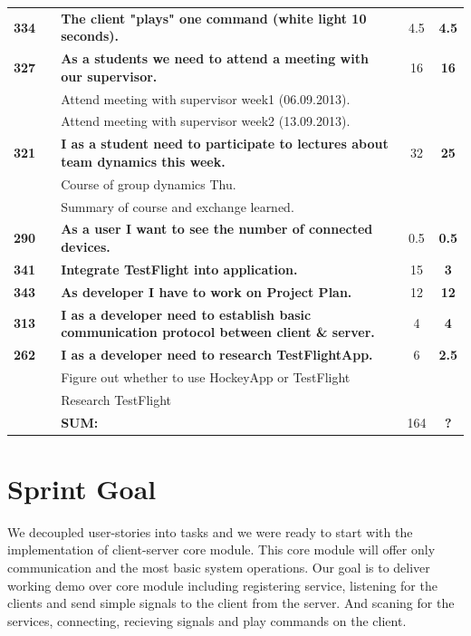 \begin{longtable}
\begin{tabularx}{\textwidth}{ccXcc}
\textbf{334} 	&& {\bf The client "plays" one command (white light 10 seconds). } 	& 		4.5	& \textbf{4.5} \\

\textbf{327} 	&& {\bf As a students we need to attend a meeting with our supervisor. } 	& 		16	& \textbf{16} \\
				&& Attend meeting with supervisor week1 (06.09.2013).	&  &  \\
				&& Attend meeting with supervisor week2 (13.09.2013).	&  &  \\

\textbf{321} 	&& {\bf I as a student need to participate to lectures about team dynamics this week. } 	& 		32	& \textbf{25} \\
				&& Course of group dynamics Thu.	&  &  \\
				&& Summary of course and exchange learned.	&  &  \\
				
\textbf{290} 	&& {\bf As a user I want to see the number of connected devices. } 	& 		0.5	& \textbf{0.5} \\

\textbf{341} 	&& {\bf Integrate TestFlight into application. } 	& 		15	& \textbf{3} \\

\textbf{343} 	&& {\bf As developer I have to work on Project Plan.} 	& 		12	& \textbf{12} \\

\textbf{313} 	&& {\bf I as a developer need to establish basic communication protocol between client \& server.} 	& 		4	& \textbf{4} \\

\textbf{262} 	&& {\bf I as a developer need to research TestFlightApp. } 	& 		6	& \textbf{2.5} \\
				&& Figure out whether to use HockeyApp or TestFlight&  &  \\
				&& Research TestFlight	&  &  \\
				
\hline
				&& \textbf{SUM:}		&		164	& \textbf{?}
 \\																			
\bottomrule[1mm]
\end{tabularx}
\end{longtable}

\section{Sprint Goal}
We decoupled user-stories into tasks and we were ready to start with the implementation of client-server core module.
This core module will offer only communication and the most basic system operations. 
Our goal is to deliver working demo over core module including registering service, listening for the clients and send simple signals to the client from the server.
And scaning for the services, connecting, recieving signals and play commands on the client. 

